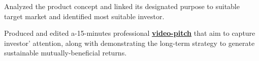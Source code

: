 \documentclass[letterpaper]{deedy-resume} %
\begin{document}
\begin{minipage}[t]{0.66\textwidth}
\begin{tightitemize}
\item Analyzed the product concept and linked its designated purpose to suitable target market and identified most suitable investor.
\item Produced and edited a-15-minutes professional  \href{https://drive.google.com/file/d/0B7mZbJb-qiSUOGc5SlpLU3ZRMnc/view?usp=sharing}{\bf video-pitch} that aim to capture investor’ attention, along with demonstrating the long-term strategy to generate sustainable mutually-beneficial returns.
\end{tightitemize}
\sectionspace %
\end{minipage} %








\end{document}
